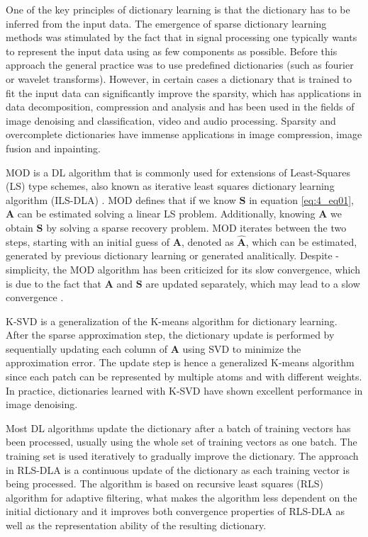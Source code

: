One of the key principles of dictionary learning is that the dictionary has to be inferred from the input data. The emergence of sparse dictionary learning methods was stimulated by the fact that in signal processing one typically wants to represent the input data using as few components as possible. Before this approach the general practice was to use predefined dictionaries (such as fourier or wavelet transforms). However, in certain cases a dictionary that is trained to fit the input data can significantly improve the sparsity, which has applications in data decomposition, compression and analysis and has been used in the fields of image denoising and classification, video and audio processing. Sparsity and overcomplete dictionaries have immense applications in image compression, image fusion and inpainting.

MOD \cite{engan1999method} is a DL algorithm that is commonly used for extensions of Least-Squares (LS) type schemes, also known as iterative least squares dictionary learning algorithm (ILS-DLA) \cite{engan2007family}. MOD defines that if we know $\boldsymbol{S}$ in equation \ref{eq:4_eq01}, $\boldsymbol{A}$ can be estimated solving a linear LS problem. Additionally, knowing $\boldsymbol{A}$ we obtain $\boldsymbol{S}$ by solving a sparse recovery problem. MOD iterates between the two steps, starting with an initial guess of $\boldsymbol{A}$, denoted as $\hat{\boldsymbol{A}}$, which can be estimated, generated by previous dictionary learning or generated analitically. Despite - simplicity, the MOD algorithm has been criticized for its slow convergence, which is due to the fact that $\boldsymbol{A}$ and $\boldsymbol{S}$ are updated separately, which may lead to a slow convergence \cite{aharon2006rm}.

K-SVD \cite{aharon2006rm} is a generalization of the K-means algorithm for dictionary learning. After the sparse approximation step, the dictionary update is performed by sequentially updating each column of $\boldsymbol{A}$ using SVD to minimize the approximation error. The update step is hence a generalized K-means algorithm since each patch can be represented by multiple atoms and with different weights. In practice, dictionaries learned with K-SVD
have shown excellent performance in image denoising. 

Most DL algorithms update the dictionary after a batch of training vectors has been processed, usually using the whole set of training vectors as one batch. The training set is used iteratively to gradually improve the dictionary. The approach in RLS-DLA \cite{skretting2010recursive} is a continuous update of the dictionary as each training vector is being processed. The algorithm is based on recursive least squares (RLS) algorithm for adaptive filtering, what makes the algorithm less dependent on the initial dictionary and it improves both convergence properties of RLS-DLA as well as the representation ability of the resulting dictionary. 

